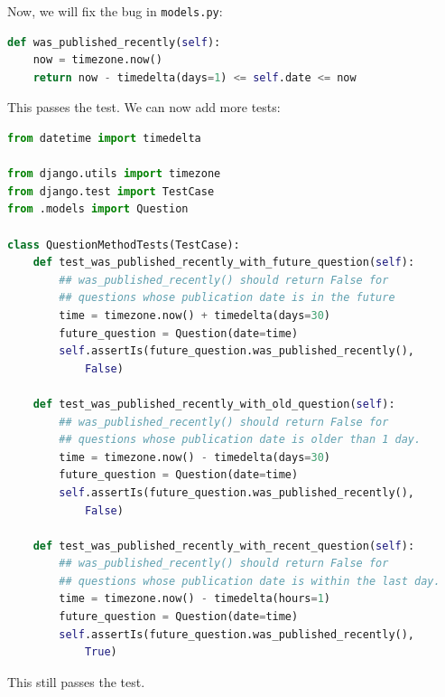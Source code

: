 \documentclass[a4paper, openany]{memoir}
\begin{document}
    \noindent Now, we will fix the bug in \texttt{models.py}:
\begin{lstlisting}[language=python]
def was_published_recently(self):
    now = timezone.now()
    return now - timedelta(days=1) <= self.date <= now
\end{lstlisting}
    This passes the test. We can now add more tests:
\begin{lstlisting}[language=python]
from datetime import timedelta

from django.utils import timezone
from django.test import TestCase
from .models import Question

class QuestionMethodTests(TestCase):
    def test_was_published_recently_with_future_question(self):
        ## was_published_recently() should return False for
        ## questions whose publication date is in the future
        time = timezone.now() + timedelta(days=30)
        future_question = Question(date=time)
        self.assertIs(future_question.was_published_recently(), 
            False)
    
    def test_was_published_recently_with_old_question(self):
        ## was_published_recently() should return False for
        ## questions whose publication date is older than 1 day.
        time = timezone.now() - timedelta(days=30)
        future_question = Question(date=time)
        self.assertIs(future_question.was_published_recently(), 
            False)
    
    def test_was_published_recently_with_recent_question(self):
        ## was_published_recently() should return False for
        ## questions whose publication date is within the last day.
        time = timezone.now() - timedelta(hours=1)
        future_question = Question(date=time)
        self.assertIs(future_question.was_published_recently(), 
            True)
\end{lstlisting}
    This still passes the test.
\end{document}
